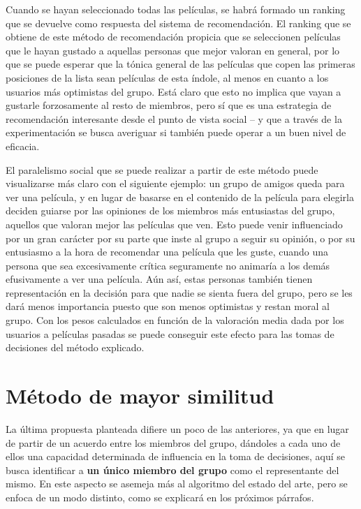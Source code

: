 Cuando se hayan seleccionado todas las películas, se habrá formado un ranking que se devuelve como respuesta del sistema de recomendación. El ranking que se obtiene de este método de recomendación propicia que se seleccionen películas que le hayan gustado a aquellas personas que mejor valoran en general, por lo que se puede esperar que la tónica general de las películas que copen las primeras posiciones de la lista sean películas de esta índole, al menos en cuanto a los usuarios más optimistas del grupo. Está claro que esto no implica que vayan a gustarle forzosamente al resto de miembros, pero sí que es una estrategia de recomendación interesante desde el punto de vista social -- y que a través de la experimentación se busca averiguar si también puede operar a un buen nivel de eficacia.

El paralelismo social que se puede realizar a partir de este método puede visualizarse más claro con el siguiente ejemplo: un grupo de amigos queda para ver una película, y en lugar de basarse en el contenido de la película para elegirla deciden guiarse por las opiniones de los miembros más entusiastas del grupo, aquellos que valoran mejor las películas que ven. Esto puede venir influenciado por un gran carácter por su parte que inste al grupo a seguir su opinión, o por su entusiasmo a la hora de recomendar una película que les guste, cuando una persona que sea excesivamente crítica seguramente no animaría a los demás efusivamente a ver una película. Aún así, estas personas también tienen representación en la decisión para que nadie se sienta fuera del grupo, pero se les dará menos importancia puesto que son menos optimistas y restan moral al grupo. Con los pesos calculados en función de la valoración media dada por los usuarios a películas pasadas se puede conseguir este efecto para las tomas de decisiones del método explicado.

\section{Método de mayor similitud}

La última propuesta planteada difiere un poco de las anteriores, ya que en lugar de partir de un acuerdo entre los miembros del grupo, dándoles a cada uno de ellos una capacidad determinada de influencia en la toma de decisiones, aquí se busca identificar a \textbf{un único miembro del grupo} como el representante del mismo. En este aspecto se asemeja más al algoritmo del estado del arte, pero se enfoca de un modo distinto, como se explicará en los próximos párrafos.

